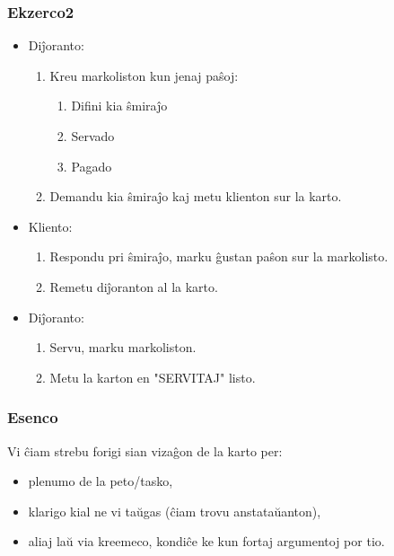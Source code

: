   \begin{frame}
    \frametitle{Ekzerco2}

	\begin{itemize}
			
		\item Diĵoranto:
		\begin{enumerate}
			\item Kreu markoliston kun jenaj paŝoj:
				\begin{enumerate}
					\item Difini kia ŝmiraĵo
					\item Servado
					\item Pagado
				\end{enumerate}
				
			\item Demandu kia ŝmiraĵo kaj metu klienton sur la karto.
		\end{enumerate}
				
    
		\item Kliento:
		\begin{enumerate}
			\item Respondu pri ŝmiraĵo, marku ĝustan paŝon sur la markolisto.
			\item Remetu diĵoranton al la karto.
		\end{enumerate}    
		
		\item Diĵoranto:
		\begin{enumerate}
			\item Servu, marku markoliston.
			\item Metu la karton en "SERVITAJ" listo.
		\end{enumerate}    
			
	\end{itemize}		
	
    
  \end{frame}


  \begin{frame}
    \frametitle{Esenco}
    
	Vi ĉiam strebu \alert{forigi sian vizaĝon de la karto} per:
    
    \begin{itemize}
    	\item plenumo de la peto/tasko,
    	\item klarigo kial ne vi taŭgas (ĉiam trovu anstataŭanton),
    	\item aliaj laŭ via kreemeco, kondiĉe ke kun \alert{fortaj argumentoj} por tio.
    \end{itemize}
    
  \end{frame}

